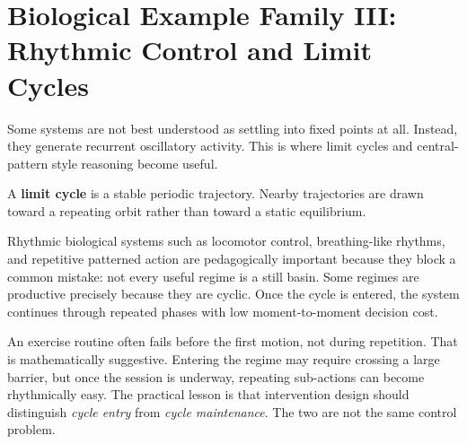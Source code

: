 \section{Biological Example Family III: Rhythmic Control and Limit Cycles}

Some systems are not best understood as settling into fixed points at all.
Instead, they generate recurrent oscillatory activity. This is where limit
cycles and central-pattern style reasoning become useful.

\begin{definition}
A \textbf{limit cycle} is a stable periodic trajectory. Nearby trajectories are
drawn toward a repeating orbit rather than toward a static equilibrium.
\end{definition}

\begin{discussion}
Rhythmic biological systems such as locomotor control, breathing-like rhythms,
and repetitive patterned action are pedagogically important because they block
a common mistake: not every useful regime is a still basin. Some regimes are
productive precisely because they are cyclic. Once the cycle is entered, the
system continues through repeated phases with low moment-to-moment decision
cost.
\end{discussion}

\begin{example}
An exercise routine often fails before the first motion, not during repetition.
That is mathematically suggestive. Entering the regime may require crossing a
large barrier, but once the session is underway, repeating sub-actions can
become rhythmically easy. The practical lesson is that intervention design
should distinguish \emph{cycle entry} from \emph{cycle maintenance}. The two are
not the same control problem.
\end{example}
